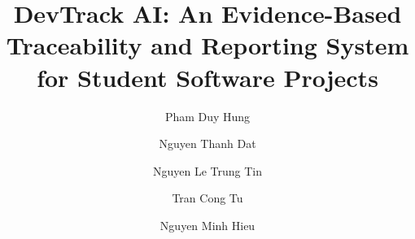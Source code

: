 \documentclass[runningheads]{llncs}
\begin{document}
\title{DevTrack AI: An Evidence-Based Traceability and Reporting System for Student Software Projects}


\author{Pham Duy Hung \and
Nguyen Thanh Dat \and
Nguyen Le Trung Tin \and
Tran Cong Tu \and
Nguyen Minh Hieu}



\maketitle









\end{document}
